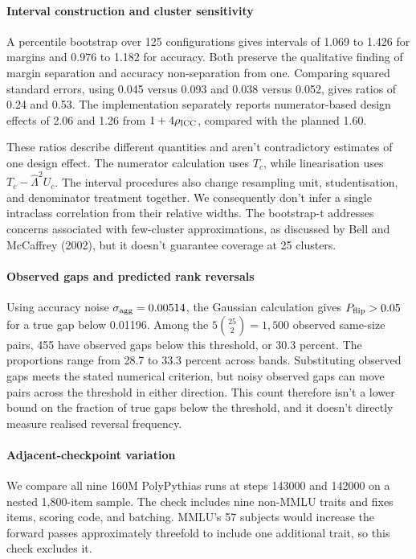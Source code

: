 \paragraph{Interval construction and cluster sensitivity}
A percentile bootstrap over 125 configurations gives intervals of 1.069 to 1.426 for margins and 0.976 to 1.182 for accuracy. Both preserve the qualitative finding of margin separation and accuracy non-separation from one. Comparing squared standard errors, using 0.045 versus 0.093 and 0.038 versus 0.052, gives ratios of 0.24 and 0.53. The implementation separately reports numerator-based design effects of 2.06 and 1.26 from $1+4\rho_{\rm ICC}$, compared with the planned 1.60.

These ratios describe different quantities and aren't contradictory estimates of one design effect. The numerator calculation uses $T_c$, while linearisation uses $T_c-\widehat\Lambda^2U_c$. The interval procedures also change resampling unit, studentisation, and denominator treatment together. We consequently don't infer a single intraclass correlation from their relative widths. The bootstrap-t addresses concerns associated with few-cluster approximations, as discussed by Bell and McCaffrey (2002), but it doesn't guarantee coverage at 25 clusters.

\paragraph{Observed gaps and predicted rank reversals}
Using accuracy noise $\sigma_{\rm agg}=0.00514$, the Gaussian calculation gives $P_{\rm flip}>0.05$ for a true gap below 0.01196. Among the $5\binom{25}{2}=1{,}500$ observed same-size pairs, 455 have observed gaps below this threshold, or 30.3 percent. The proportions range from 28.7 to 33.3 percent across bands. Substituting observed gaps meets the stated numerical criterion, but noisy observed gaps can move pairs across the threshold in either direction. This count therefore isn't a lower bound on the fraction of true gaps below the threshold, and it doesn't directly measure realised reversal frequency.

\paragraph{Adjacent-checkpoint variation}
We compare all nine 160M PolyPythias runs at steps 143000 and 142000 on a nested 1,800-item sample. The check includes nine non-MMLU traits and fixes items, scoring code, and batching. MMLU's 57 subjects would increase the forward passes approximately threefold to include one additional trait, so this check excludes it.


